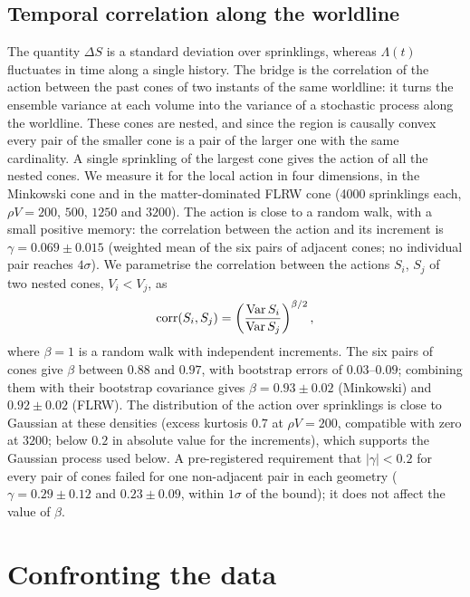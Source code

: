 \documentclass{iopjournal}
\newcommand{\rhoV}{\rho V}
\begin{document}
\subsection{Temporal correlation along the worldline}

The quantity $\Delta S$ is a standard deviation over sprinklings, whereas
$\Lambda(t)$ fluctuates in time along a single history. The bridge is the correlation of
the action between the past cones of two instants of the same worldline: it
turns the ensemble variance at each volume into the variance of a stochastic
process along the worldline. These cones are nested,
and since the region is causally convex every pair of the smaller cone is a
pair of the larger one with the same cardinality. A single sprinkling of the
largest cone gives the action of all the nested cones. We measure it for the
local action in four dimensions, in the Minkowski cone and in the
matter-dominated FLRW cone (4000 sprinklings each, $\rhoV=200$, $500$, $1250$
and $3200$). The action is close to a random walk, with a small positive
memory: the correlation between the action and its increment is
$\gamma=0.069\pm0.015$ (weighted mean of the six pairs of adjacent cones;
no individual pair reaches $4\sigma$). We parametrise the correlation between
the actions $S_i$, $S_j$ of two nested cones, $V_i<V_j$, as
\begin{equation}
{\rm corr}(S_i,S_j)=\left(\frac{{\rm Var}\,S_i}{{\rm Var}\,S_j}\right)^{\beta/2},
\label{eq:beta}
\end{equation}
where $\beta=1$ is a random walk with independent increments. The six pairs of
cones give $\beta$ between $0.88$ and $0.97$, with bootstrap errors of
$0.03$--$0.09$; combining them with their bootstrap covariance gives
$\beta=0.93\pm0.02$ (Minkowski) and $0.92\pm0.02$ (FLRW). The distribution of
the action over sprinklings is close to Gaussian at these densities (excess
kurtosis $0.7$ at $\rhoV=200$, compatible with zero at $3200$; below $0.2$ in
absolute value for the increments), which supports the Gaussian process
used below. A pre-registered requirement that
$|\gamma|<0.2$ for every pair of cones failed for one non-adjacent pair in
each geometry ($\gamma=0.29\pm0.12$ and $0.23\pm0.09$, within $1\sigma$ of
the bound); it does not affect the value of $\beta$.

\section{Confronting the data}
\label{sec:data}
\end{document}
